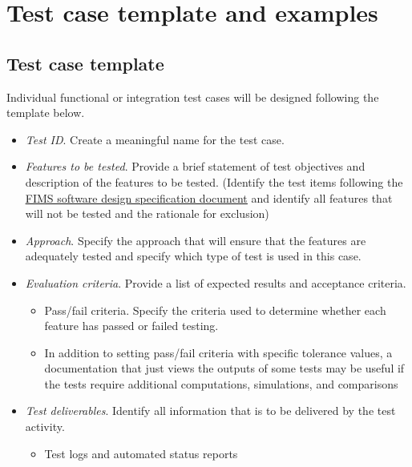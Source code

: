 \documentclass[
]{book}
\providecommand{\tightlist}{%
  \setlength{\itemsep}{0pt}\setlength{\parskip}{0pt}}
\begin{document}
\hypertarget{test-case-template-and-examples}{%
\section{Test case template and examples}\label{test-case-template-and-examples}}

\hypertarget{test-case-template-1}{%
\subsection{Test case template}\label{test-case-template-1}}

Individual functional or integration test cases will be designed following the template below.

\begin{itemize}
\item
  \emph{Test ID}. Create a meaningful name for the test case.
\item
  \emph{Features to be tested}. Provide a brief statement of test objectives and description of the features to be tested. (Identify the test items following the \href{https://docs.google.com/document/d/1iSEhJqcpSD269QdABeDE4aBZGqGcBrIrLnS7eMkSYv0/edit?usp=sharing}{\underline{FIMS software design specification document}} and identify all features that will not be tested and the rationale for exclusion)
\item
  \emph{Approach}. Specify the approach that will ensure that the features are adequately tested and specify which type of test is used in this case.
\item
  \emph{Evaluation criteria}. Provide a list of expected results and acceptance criteria.

  \begin{itemize}
  \item
    Pass/fail criteria. Specify the criteria used to determine whether each feature has passed or failed testing.
  \item
    In addition to setting pass/fail criteria with specific tolerance values, a documentation that just views the outputs of some tests may be useful if the tests require additional computations, simulations, and comparisons
  \end{itemize}
\item
  \emph{Test deliverables}. Identify all information that is to be delivered by the test activity.

  \begin{itemize}
  \tightlist
  \item
    Test logs and automated status reports
  \end{itemize}
\end{itemize}
\end{document}
